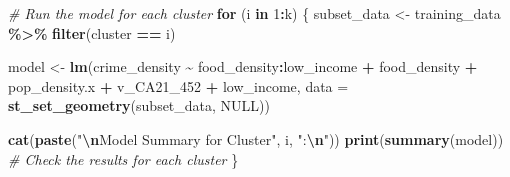 \documentclass[
]{article}
\newenvironment{Shaded}{\begin{snugshade}}{\end{snugshade}}
\newcommand{\AttributeTok}[1]{\textcolor[rgb]{0.13,0.29,0.53}{#1}}
\newcommand{\CommentTok}[1]{\textcolor[rgb]{0.56,0.35,0.01}{\textit{#1}}}
\newcommand{\ConstantTok}[1]{\textcolor[rgb]{0.56,0.35,0.01}{#1}}
\newcommand{\ControlFlowTok}[1]{\textcolor[rgb]{0.13,0.29,0.53}{\textbf{#1}}}
\newcommand{\DecValTok}[1]{\textcolor[rgb]{0.00,0.00,0.81}{#1}}
\newcommand{\FunctionTok}[1]{\textcolor[rgb]{0.13,0.29,0.53}{\textbf{#1}}}
\newcommand{\NormalTok}[1]{#1}
\newcommand{\OtherTok}[1]{\textcolor[rgb]{0.56,0.35,0.01}{#1}}
\newcommand{\SpecialCharTok}[1]{\textcolor[rgb]{0.81,0.36,0.00}{\textbf{#1}}}
\newcommand{\StringTok}[1]{\textcolor[rgb]{0.31,0.60,0.02}{#1}}
\begin{document}
\begin{Shaded}
\begin{Highlighting}[]
\CommentTok{\# Run the model for each cluster}
\ControlFlowTok{for}\NormalTok{ (i }\ControlFlowTok{in} \DecValTok{1}\SpecialCharTok{:}\NormalTok{k) \{}
\NormalTok{  subset\_data }\OtherTok{\textless{}{-}}\NormalTok{ training\_data }\SpecialCharTok{\%\textgreater{}\%} \FunctionTok{filter}\NormalTok{(cluster }\SpecialCharTok{==}\NormalTok{ i)}
  
\NormalTok{  model }\OtherTok{\textless{}{-}} \FunctionTok{lm}\NormalTok{(crime\_density }\SpecialCharTok{\textasciitilde{}} 
\NormalTok{                food\_density}\SpecialCharTok{:}\NormalTok{low\_income }\SpecialCharTok{+} 
\NormalTok{                food\_density }\SpecialCharTok{+} 
\NormalTok{                pop\_density.x }\SpecialCharTok{+} 
\NormalTok{                v\_CA21\_452 }\SpecialCharTok{+}
\NormalTok{                low\_income, }
              \AttributeTok{data =} \FunctionTok{st\_set\_geometry}\NormalTok{(subset\_data, }\ConstantTok{NULL}\NormalTok{))}
  
  \FunctionTok{cat}\NormalTok{(}\FunctionTok{paste}\NormalTok{(}\StringTok{"}\SpecialCharTok{\textbackslash{}n}\StringTok{Model Summary for Cluster"}\NormalTok{, i, }\StringTok{":}\SpecialCharTok{\textbackslash{}n}\StringTok{"}\NormalTok{))}
  \FunctionTok{print}\NormalTok{(}\FunctionTok{summary}\NormalTok{(model)) }\CommentTok{\# Check the results for each cluster}
\NormalTok{\}}
\end{Highlighting}
\end{Shaded}
\end{document}
